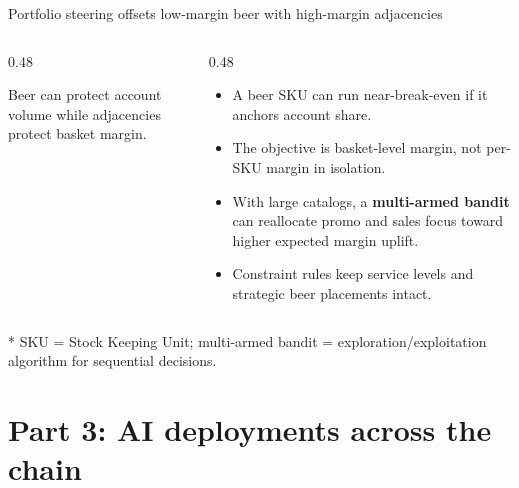 \documentclass[aspectratio=169,10pt]{beamer}
\newcommand{\timing}[1]{\textnormal{\footnotesize\color{TechTeal}{#1}}}
\newcommand{\acronymnote}[1]{%
  \vfill
  {\raggedright\tiny\color{MutedGray}* #1\par}
}
\begin{document}
\begin{frame}{Portfolio steering offsets low-margin beer with high-margin adjacencies}
  \begin{columns}[T,onlytextwidth]
    \begin{column}{0.48\textwidth}
      \centering\footnotesize Beer can protect account volume while adjacencies protect basket margin.
    \end{column}
    \begin{column}{0.48\textwidth}
      \footnotesize
      \begin{itemize}[<+->]\setlength\itemsep{0.75em}
        \item A beer SKU can run near-break-even if it anchors account share.
        \item The objective is basket-level margin, not per-SKU margin in isolation.
        \item With large catalogs, a \textbf{multi-armed bandit} can reallocate promo and sales focus toward higher expected margin uplift.
        \item Constraint rules keep service levels and strategic beer placements intact.
      \end{itemize}
    \end{column}
  \end{columns}
  \acronymnote{SKU = Stock Keeping Unit; multi-armed bandit = exploration/exploitation algorithm for sequential decisions.}
\end{frame}

\section[Part 3]{\texorpdfstring{Part 3: AI deployments across the chain \timing{(25 min)}}{Part 3}}
\end{document}
